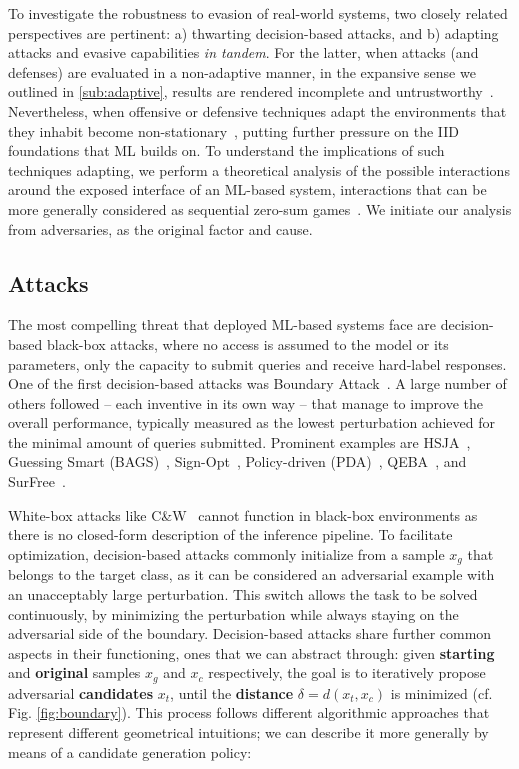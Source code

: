\label{sec:approach}
To investigate the robustness to evasion of real-world systems, two closely related perspectives are pertinent: a) thwarting decision-based attacks, and b) adapting attacks and evasive capabilities \textit{in tandem}.
For the latter, when attacks (and defenses) are evaluated in a non-adaptive manner, in the expansive sense we outlined in \autoref{sub:adaptive}, results are rendered incomplete and untrustworthy~\cite{tramer2020adaptive, pintor2022indicators}.
Nevertheless, when offensive or defensive techniques adapt the environments that they inhabit become non-stationary~\cite{hernandez2017survey}, putting further pressure on the IID foundations that ML builds on.
To understand the implications of such techniques adapting, we perform a theoretical analysis of the possible interactions around the exposed interface of an ML-based system, interactions that can be more generally considered as sequential zero-sum games~\cite{littman1994markov, hardt2016strategic, bose2020adversarial}.
We initiate our analysis from adversaries, as the original factor and cause.

\subsection{Attacks}
The most compelling threat that deployed ML-based systems face are decision-based black-box attacks, where no access is assumed to the model or its parameters, only the capacity to submit queries and receive hard-label responses.
One of the first decision-based attacks was Boundary Attack~\cite{brendel2018decision}.
A large number of others followed -- each inventive in its own way -- that manage to improve the overall performance, typically measured as the lowest perturbation achieved for the minimal amount of queries submitted.
Prominent examples are HSJA~\cite{chen2020hopskipjumpattack}, Guessing Smart (BAGS)~\cite{brunner2019guessing}, Sign-Opt~\cite{cheng2019sign}, Policy-driven (PDA)~\cite{yan2020policy}, QEBA~\cite{li2020qeba}, and SurFree~\cite{maho2021surfree}.

White-box attacks like C\&W~\cite{carlini2017towards} cannot function in black-box environments as there is no closed-form description of the inference pipeline.
To facilitate optimization, decision-based attacks commonly initialize from a sample $x_g$ that belongs to the target class, as it can be considered an adversarial example with an unacceptably large perturbation.
This switch allows the task to be solved continuously, by minimizing the perturbation while always staying on the adversarial side of the boundary.
Decision-based attacks share further common aspects in their functioning, ones that we can abstract through: given \textbf{starting} and \textbf{original} samples $x_g$ and $x_c$ respectively, the goal is to iteratively propose adversarial \textbf{candidates} $x_t$, until the \textbf{distance} $\delta = d(x_t, x_c)$ is minimized (cf. Fig. \ref{fig:boundary}).
This process follows different algorithmic approaches that represent different geometrical intuitions; we can describe it more generally by means of a candidate generation policy:

